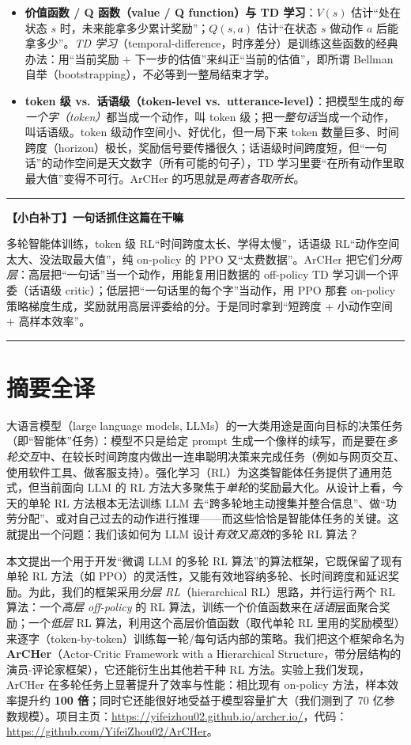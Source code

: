 \documentclass[11pt,UTF8,fontset=fandol]{ctexart}
\newenvironment{tip}[1]{%
  \par\smallskip\noindent\rule{\linewidth}{0.4pt}\par\nobreak
  \noindent\textbf{【小白补丁】#1}\par\nobreak\noindent\ignorespaces
}{%
  \par\noindent\rule{\linewidth}{0.4pt}\par\smallskip
}
\begin{document}
\begin{itemize}[leftmargin=1.5em]
\item \textbf{价值函数 / Q 函数（value / Q function）与 TD 学习}：$V(s)$ 估计“处在状态 $s$ 时，未来能拿多少累计奖励”；$Q(s,a)$ 估计“在状态 $s$ 做动作 $a$ 后能拿多少”。\emph{TD 学习}（temporal-difference，时序差分）是训练这些函数的经典办法：用“当前奖励 + 下一步的估值”来纠正“当前的估值”，即所谓 Bellman 自举（bootstrapping），不必等到一整局结束才学。

\item \textbf{token 级 vs.\ 话语级（token-level vs.\ utterance-level）}：把模型生成的\emph{每一个字（token）}都当成一个动作，叫 token 级；把\emph{一整句话}当成一个动作，叫话语级。token 级动作空间小、好优化，但一局下来 token 数量巨多、时间跨度（horizon）极长，奖励信号要传播很久；话语级时间跨度短，但“一句话”的动作空间是天文数字（所有可能的句子），TD 学习里要“在所有动作里取最大值”变得不可行。ArCHer 的巧思就是\emph{两者各取所长}。
\end{itemize}

\begin{tip}{一句话抓住这篇在干嘛}
多轮智能体训练，token 级 RL“时间跨度太长、学得太慢”，话语级 RL“动作空间太大、没法取最大值”，纯 on-policy 的 PPO 又“太费数据”。ArCHer 把它们\emph{分两层}：高层把“一句话”当一个动作，用能复用旧数据的 off-policy TD 学习训一个评委（话语级 critic）；低层把“一句话里的每个字”当动作，用 PPO 那套 on-policy 策略梯度生成，奖励就用高层评委给的分。于是同时拿到“短跨度 + 小动作空间 + 高样本效率”。
\end{tip}

\section{摘要全译}

大语言模型（large language models, LLMs）的一大类用途是面向目标的决策任务（即“智能体”任务）：模型不只是给定 prompt 生成一个像样的续写，而是要在\emph{多轮交互}中、在较长时间跨度内做出一连串聪明决策来完成任务（例如与网页交互、使用软件工具、做客服支持）。强化学习（RL）为这类智能体任务提供了通用范式，但当前面向 LLM 的 RL 方法大多聚焦于\emph{单轮}的奖励最大化。从设计上看，今天的单轮 RL 方法根本无法训练 LLM 去“跨多轮地主动搜集并整合信息”、做“功劳分配”、或对自己过去的动作进行推理——而这些恰恰是智能体任务的关键。这就提出一个问题：我们该如何为 LLM 设计\emph{有效又高效}的多轮 RL 算法？

本文提出一个用于开发“微调 LLM 的多轮 RL 算法”的算法框架，它既保留了现有单轮 RL 方法（如 PPO）的灵活性，又能有效地容纳多轮、长时间跨度和延迟奖励。为此，我们的框架采用\emph{分层 RL}（hierarchical RL）思路，并行运行两个 RL 算法：一个\emph{高层 off-policy} 的 RL 算法，训练一个价值函数来在\emph{话语}层面聚合奖励；一个\emph{低层} RL 算法，利用这个高层价值函数（取代单轮 RL 里用的奖励模型）来逐字（token-by-token）训练每一轮/每句话内部的策略。我们把这个框架命名为\textbf{ArCHer}（Actor-Critic Framework with a Hierarchical Structure，带分层结构的演员-评论家框架），它还能衍生出其他若干种 RL 方法。实验上我们发现，ArCHer 在多轮任务上显著提升了效率与性能：相比现有 on-policy 方法，样本效率提升约 \textbf{100 倍}；同时它还能很好地受益于模型容量扩大（我们测到了 70 亿参数规模）。项目主页：\url{https://yifeizhou02.github.io/archer.io/}，代码：\url{https://github.com/YifeiZhou02/ArCHer}。
\end{document}
